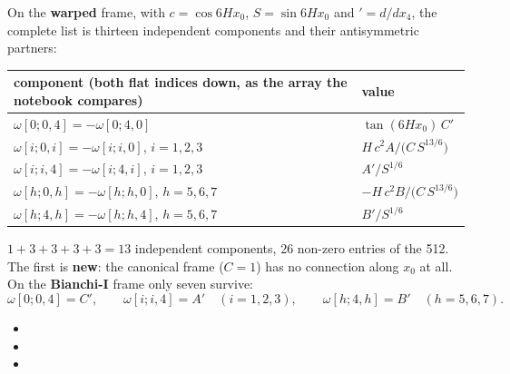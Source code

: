 On the \textbf{warped} frame, with $c=\cos 6Hx_0$, $S=\sin 6Hx_0$ and ${}'=d/dx_4$, the complete list is
thirteen independent components and their antisymmetric partners:
\begin{center}
\renewcommand{\arraystretch}{1.35}
\begin{tabular}{@{}ll@{}}
\toprule
component (both flat indices down, as the array the notebook compares) & value\\
\midrule
$\omega[0;0,4]=-\omega[0;4,0]$ & $\tan(6Hx_0)\,C'$\\
$\omega[i;0,i]=-\omega[i;i,0]$, $i=1,2,3$ & $H\,c^2A/\bigl(C\,S^{13/6}\bigr)$\\
$\omega[i;i,4]=-\omega[i;4,i]$, $i=1,2,3$ & $A'/S^{1/6}$\\
$\omega[h;0,h]=-\omega[h;h,0]$, $h=5,6,7$ & $-H\,c^2B/\bigl(C\,S^{13/6}\bigr)$\\
$\omega[h;4,h]=-\omega[h;h,4]$, $h=5,6,7$ & $B'/S^{1/6}$\\
\bottomrule
\end{tabular}
\end{center}
$1+3+3+3+3=13$ independent components, 26 non-zero entries of the 512. The first is \textbf{new}: the
canonical frame ($C=1$) has no connection along $x_0$ at all. On the \textbf{Bianchi-I} frame only seven
survive:
\[
  \omega[0;0,4]=C',\qquad \omega[i;i,4]=A'\quad(i=1,2,3),\qquad \omega[h;4,h]=B'\quad(h=5,6,7).
\]
\begin{itemize}
  \item {}
  \item {}
  \item {}
\end{itemize}

